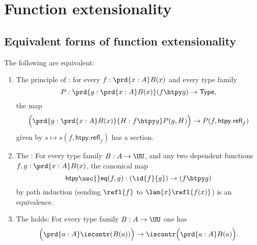 \chapter{Function extensionality}

\section{Equivalent forms of function extensionality}
\begin{thm}\label{thm:funext_wkfunext}
The following are equivalent:
\begin{enumerate}
\item The principle of : for every $f:\prd{x:A}B(x)$ and every type family
\begin{equation*}
P : \prd{g:\prd{x:A}B(x)}(f\htpy g)\to\mathsf{Type},
\end{equation*}
the map
\begin{equation*}
\Big(\prd{g:\prd{x:A}B(x)}{H:f\htpy g}P(g,H)\Big)\to P(f,\mathsf{htpy.refl}_f)
\end{equation*}
given by $s\mapsto s(f,\mathsf{htpy.refl}_f)$ has a section.
\item The : For every type family $B:A\to\UU$, and any two dependent functions $f,g:\prd{x:A}B(x)$, the canonical map
\begin{equation*}
\mathsf{htpy\usc{}eq}(f,g) : (\id{f}{g})\to (f\htpy g)
\end{equation*}
by path induction (sending $\refl{f}$ to $\lam{x}\refl{f(x)}$) is an equivalence.
\item The  holds: For every type family $B:A\to\UU$ one has
\begin{equation*}
\Big(\prd{a:A}\iscontr(B(a))\Big)\to\iscontr\Big(\prd{a:A}B(a)\Big).
\end{equation*}
\end{enumerate}
\end{thm}

